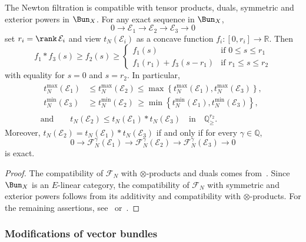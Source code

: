 \begin{prop}
The Newton filtration is compatible with tensor products, duals, symmetric and exterior powers in $\Bun_{X}$. For any exact sequence in $\Bun_{X}$,
\[
0\rightarrow\mathcal{E}_{1}\rightarrow\mathcal{E}_{2}\rightarrow\mathcal{E}_{3}\rightarrow0
\]
set $r_{i}=\rank\,\mathcal{E}_{i}$ and view $t_{N}(\mathcal{E}_{i})$ as a concave function $f_{i}:[0,r_{i}]\rightarrow\mathbb{R}$. Then
\[
f_{1}\ast f_{3}(s)\geq f_{2}(s)\geq
\begin{cases}
f_{1}(s) & \text{if }0\leq s\leq r_{1}\\
f_{1}(r_{1})+f_{3}(s-r_{1}) & \text{if }r_{1}\leq s\leq r_{2}
\end{cases}
\]
with equality for $s=0$ and $s=r_{2}$. In particular,
\begin{gather*}
\begin{aligned}
t_{N}^{\max}(\mathcal{E}_{1}) & \leq t_{N}^{\max}(\mathcal{E}_{2}) \leq \max\left\{ t_{N}^{\max}(\mathcal{E}_{1}),t_{N}^{\max}(\mathcal{E}_{3})\right\},\\
t_{N}^{\min}(\mathcal{E}_{3}) & \geq t_{N}^{\min}(\mathcal{E}_{2}) \,\geq \min\left\{ t_{N}^{\min}(\mathcal{E}_{1}),t_{N}^{\min}(\mathcal{E}_{3})\right\},
\end{aligned}
\\
\text{and}\qquad t_{N}(\mathcal{E}_{2})\leq t_{N}(\mathcal{E}_{1})\ast t_{N}(\mathcal{E}_{3})\quad\text{in}\quad\mathbb{Q}_{\geq}^{r_{2}}.
\end{gather*}
Moreover, $t_{N}(\mathcal{E}_{2})=t_{N}(\mathcal{E}_{1})\ast t_{N}(\mathcal{E}_{3})$ if and only if for every $\gamma\in\mathbb{Q}$,
\[
0\rightarrow\mathcal{F}_{N}^{\gamma}(\mathcal{E}_{1})\rightarrow\mathcal{F}_{N}^{\gamma}(\mathcal{E}_{2})\rightarrow\mathcal{F}_{N}^{\gamma}(\mathcal{E}_{3})\rightarrow0
\]
is exact.
\end{prop}

\begin{proof}
The compatibility of $\mathcal{F}_{N}$ with $\otimes$-products and duals comes from~\cite[5.6.23]{FaFo15}. Since $\Bun_{X}$ is an $E$-linear category, the compatibility of $\mathcal{F}_{N}$ with symmetric and exterior powers follows from its additivity and compatibility with $\otimes$-products. For the remaining assertions, see~\cite[Proposition~21]{Co16} or~\cite[4.4.4]{An09}.
\end{proof}

\subsubsection{Modifications of vector bundles}


